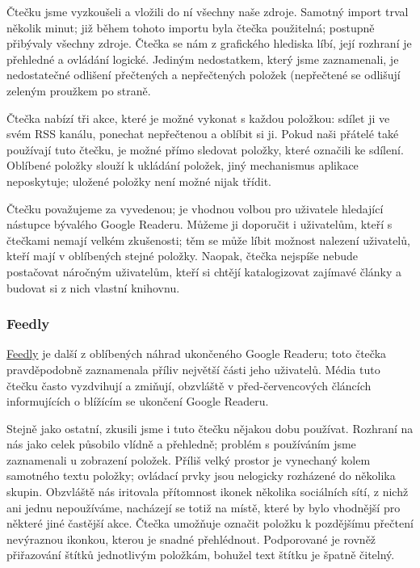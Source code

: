 Čtečku jsme vyzkoušeli a vložili do ní všechny naše zdroje.
Samotný import trval několik minut; již během tohoto importu byla čtečka použitelná; postupně přibývaly všechny zdroje.
Čtečka se nám z grafického hlediska líbí, její rozhraní je přehledné a ovládání logické.
Jediným nedostatkem, který jsme zaznamenali, je nedostatečné odlišení přečtených a nepřečtených položek (nepřečtené se odlišují zeleným proužkem po straně.

Čtečka nabízí tři akce, které je možné vykonat s každou položkou: sdílet ji ve svém RSS kanálu, ponechat nepřečtenou a oblíbit si ji.
Pokud naši přátelé také používají tuto čtečku, je možné přímo sledovat položky, které označili ke sdílení.
Oblíbené položky slouží k ukládání položek, jiný mechanismus aplikace neposkytuje; uložené položky není možné nijak třídit.

Čtečku považujeme za vyvedenou; je vhodnou volbou pro uživatele hledající nástupce bývalého Google Readeru.
Můžeme ji doporučit i uživatelům, kteří s čtečkami nemají velkém zkušenosti; těm se může líbit možnost nalezení uživatelů, kteří mají v oblíbených stejné položky.
Naopak, čtečka nejspíše nebude postačovat náročným uživatelům, kteří si chtějí katalogizovat zajímavé články a budovat si z nich vlastní knihovnu.

\subsubsection{Feedly}

\href{http://www.feedly.com/}{Feedly} je další z oblíbených náhrad ukončeného Google Readeru; toto čtečka pravděpodobně zaznamenala příliv největší části jeho uživatelů.
Média tuto čtečku často vyzdvihují a zmiňují, obzvláště v před-červencových článcích informujících o blížícím se ukončení Google Readeru.

Stejně jako ostatní, zkusili jsme i tuto čtečku nějakou dobu používat.
Rozhraní na nás jako celek působilo vlídně a přehledně; problém s používáním jsme zaznamenali u zobrazení položek.
Příliš velký prostor je vynechaný kolem samotného textu položky; ovládací prvky jsou nelogicky rozházené do několika skupin.
Obzvláště nás iritovala přítomnost ikonek několika sociálních sítí, z nichž ani jednu nepoužíváme, nacházejí se totiž na místě, které by bylo vhodnější pro některé jiné častější akce.
Čtečka umožňuje označit položku k pozdějšímu přečtení nevýraznou ikonkou, kterou je snadné přehlédnout.
Podporované je rovněž přiřazování štítků jednotlivým položkám, bohužel text štítku je špatně čitelný.

